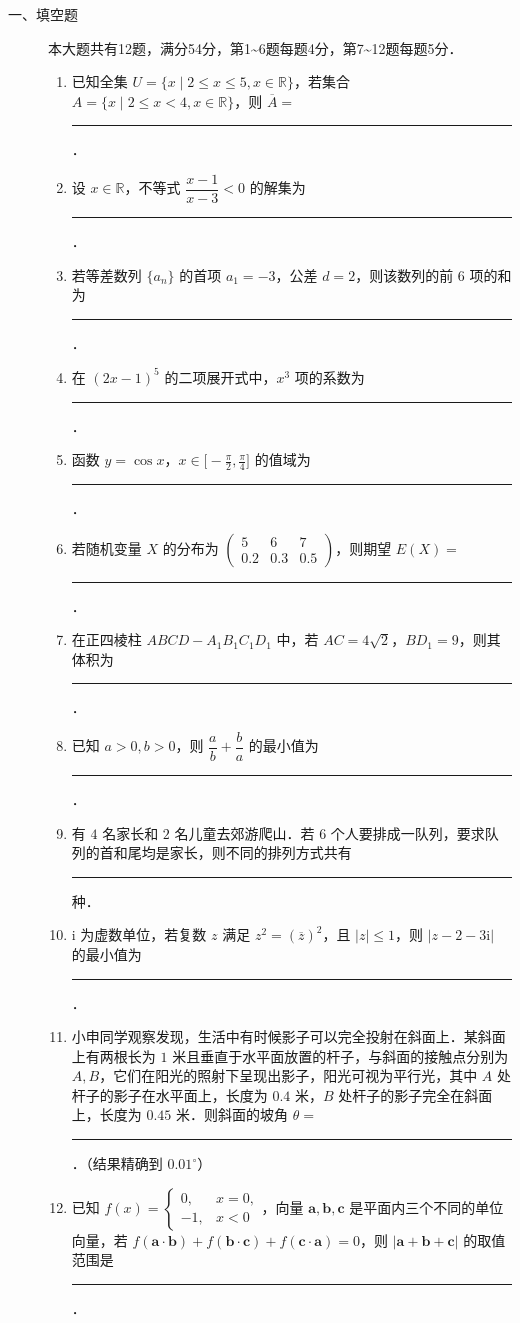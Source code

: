 \begin{description}
    \item[一、填空题] 本大题共有12题，满分54分，第1\textasciitilde6题每题4分，第7\textasciitilde12题每题5分．
    \begin{enumerate}[leftmargin=5pt]
        \item 已知全集 $U=\{x\mid2\leqslant x\leqslant5,x\in\mathbb{R}\}$，若集合 $A=\{x\mid2\leqslant x<4,x\in\mathbb{R}\}$，则 $\overline{A}=$ \rule[-0.3ex]{3em}{0.4pt}．
        \item 设 $x\in\mathbb{R}$，不等式 $\dfrac{x-1}{x-3}<0$ 的解集为 \rule[-0.3ex]{3em}{0.4pt}．
        \item 若等差数列 $\{a_n\}$ 的首项 $a_1=-3$，公差 $d=2$，则该数列的前 $6$ 项的和为 \rule[-0.3ex]{3em}{0.4pt}．
        \item 在 $(2x-1)^5$ 的二项展开式中，$x^3$ 项的系数为 \rule[-0.3ex]{3em}{0.4pt}．
        \item 函数 $y=\cos x$，$x\in\bigl[-\frac{\pi}{2},\frac{\pi}{4}\bigr]$ 的值域为 \rule[-0.3ex]{3em}{0.4pt}．
        \item 若随机变量 $X$ 的分布为 $\begin{pmatrix}5&6&7\\0.2&0.3&0.5\end{pmatrix}$，则期望 $E(X)=$ \rule[-0.3ex]{3em}{0.4pt}．
        \item 在正四棱柱 $ABCD-A_1B_1C_1D_1$ 中，若 $AC=4\sqrt{2}$，$BD_1=9$，则其体积为 \rule[-0.3ex]{3em}{0.4pt}．
        \item 已知 $a>0,b>0$，则 $\dfrac{a}{b}+\dfrac{b}{a}$ 的最小值为 \rule[-0.3ex]{3em}{0.4pt}．
        \item 有 $4$ 名家长和 $2$ 名儿童去郊游爬山．若 $6$ 个人要排成一队列，要求队列的首和尾均是家长，则不同的排列方式共有 \rule[-0.3ex]{3em}{0.4pt} 种．
        \item $\mathrm{i}$ 为虚数单位，若复数 $z$ 满足 $z^2=(\overline{z})^2$，且 $|z|\leqslant1$，则 $|z-2-3\mathrm{i}|$ 的最小值为 \rule[-0.3ex]{3em}{0.4pt}．
        \item 小申同学观察发现，生活中有时候影子可以完全投射在斜面上．某斜面上有两根长为 $1$ 米且垂直于水平面放置的杆子，与斜面的接触点分别为 $A,B$，它们在阳光的照射下呈现出影子，阳光可视为平行光，其中 $A$ 处杆子的影子在水平面上，长度为 $0.4$ 米，$B$ 处杆子的影子完全在斜面上，长度为 $0.45$ 米．则斜面的坡角 $\theta=$ \rule[-0.3ex]{3em}{0.4pt}．（结果精确到 $0.01^\circ$）
        \item 已知 $f(x)=\begin{cases}0,&x=0,\\-1,&x<0\end{cases}$，向量 $\bm a,\bm b,\bm c$ 是平面内三个不同的单位向量，若 $f(\bm a\cdot\bm b)+f(\bm b\cdot\bm c)+f(\bm c\cdot\bm a)=0$，则 $|\bm a+\bm b+\bm c|$ 的取值范围是 \rule[-0.3ex]{3em}{0.4pt}．
    \end{enumerate}
\end{description}

